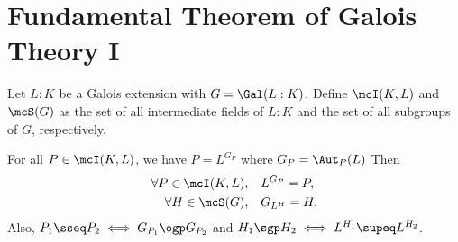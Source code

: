 \documentclass[a4paper]{article}
\begin{document}
\section{Fundamental Theorem of Galois Theory I}
\begin{tdefinition}
  Let \( L:K \) be a Galois extension with \( G = \Gal(L:K) \).
  Define \( \mcI(K,L) \) and \( \mcS(G) \) as the set of all intermediate fields of \( L:K \) and the set of all subgroups of \( G \), respectively.
\end{tdefinition}

\begin{ttheorem}
  For all \( P\in \mcI(K,L) \), we have \( P = L^{G_P} \) where \( G_P = \Aut_P(L)\)
  Then \begin{align*}
    \forall P\in \mcI(K,L), \quad &L^{G_P} = P,\\
    \forall H\in \mcS(G), \quad &G_{L^H} = H,
  \end{align*}
  Also, \( P_1\sseq P_2 \iff G_{P_1}\ogp G_{P_2} \) and \( H_1 \sgp H_2 \iff L^{H_1}\supeq L^{H_2} \). %
\end{ttheorem}






\end{document}
